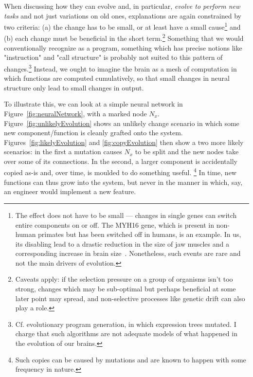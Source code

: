 When discussing how they can evolve and, in particular, {\em evolve to perform new tasks} and not just variations on old ones, explanations are again constrained by two criteria: (a) the change has to be small, or at least have a small cause\footnote{The effect does not have to be small --- changes in single genes can switch entire components on or off. The MYH16 gene, which is present in non-human primates but has been switched off in humans, is an example. In us, its disabling lead to a drastic reduction in the size of jaw muscles and a corresponding increase in brain size~\cite{carroll2005}. Nonetheless, such events are rare and not the main drivers of evolution.} and (b) each change must be beneficial in the short term.\footnote{Caveats apply: if the selection pressure on a group of organisms isn't too strong, changes which may be sub-optimal but perhaps beneficial at some later point may spread, and non-selective processes like genetic drift can also play a role.} Something that we would conventionally recognize as a program, something which has precise notions like "instruction" and "call structure" is probably not suited to this pattern of changes.\footnote{Cf. evolutionary program generation, in which expression trees mutated. I charge that such algorithms are not adequate models of what happened in the evolution of our brains.} Instead, we ought to imagine the brain as a mesh of computation in which functions are computed cumulatively, so that small changes in neural structure only lead to small changes in output.

To illustrate this, we can look at a simple neural network in Figure~\ref{fig:neuralNetwork}, with a marked node $N_x$. Figure~\ref{fig:unlikelyEvolution} shows an unlikely change scenario in which some new component/function is cleanly grafted onto the system. Figures~\ref{fig:likelyEvolution} and \ref{fig:copyEvolution} then show a two more likely scenarios: in the first a mutation causes $N_x$ to be split and the new nodes take over some of its connections. In the second, a larger component is accidentally copied as-is and, over time, is moulded to do something useful. \footnote{Such copies can be caused by mutations and are known to happen with some frequency in nature.} In time, new functions can thus grow into the system, but never in the manner in which, say, an engineer would implement a new feature. 


